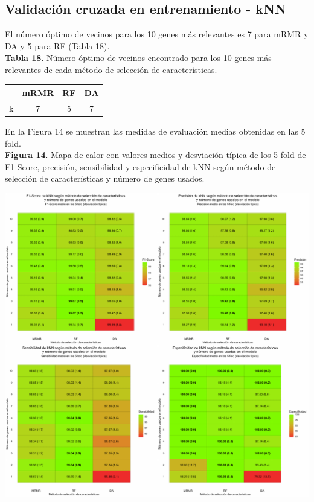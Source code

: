 \subsection{Validación cruzada en entrenamiento - kNN}

El número óptimo de vecinos para los 10 genes más relevantes es 7 para mRMR y DA y 5 para RF (Tabla 18).\\

\textbf{Tabla 18}. Número óptimo de vecinos encontrado para los 10 genes más relevantes de cada método de selección de características.

\begin{table}[H]
	\centering
	\begin{tabular}{cccc}
		\cline{2-4}
		\textbf{} & \textbf{mRMR} & \textbf{RF} & \textbf{DA} \\ \hline
		k                &    7 &    5     &   7      \\ \hline
	\end{tabular}
\end{table}

En la Figura 14 se muestran las medidas de evaluación medias obtenidas en las 5 fold.\\

\newpage
\textbf{Figura 14}. Mapa de calor con valores medios y desviación típica de los 5-fold de F1-Score, precisión, sensibilidad y especificidad de kNN según método de selección de características y número de genes usados.
\begin{center}
	\includegraphics[width=1\textwidth]{figuras/14_higado_biclase_heatmap_knn.pdf} 
\end{center}

